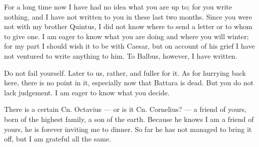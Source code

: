 

 For a long time now I have had no idea what you are up to; for you write nothing, and I have not written to you in these last two months. Since you were not with my brother Quintus, I did not know where to send a letter or to whom to give one. I am eager to know what you are doing and where you will winter; for my part I should wish it to be with Caesar, but on account of his grief I have not ventured to write anything to him. To Balbus, however, I have written.

 Do not fail yourself. Later to us, rather, and fuller for it. As for hurrying back here, there is no point in it, especially now that Battara is dead. But you do not lack judgement. I am eager to know what you decide.

 There is a certain Cn. Octavius --- or is it Cn. Cornelius? --- a friend of yours, born of the highest family, a son of the earth. Because he knows I am a friend of yours, he is forever inviting me to dinner. So far he has not managed to bring it off, but I am grateful all the same.
